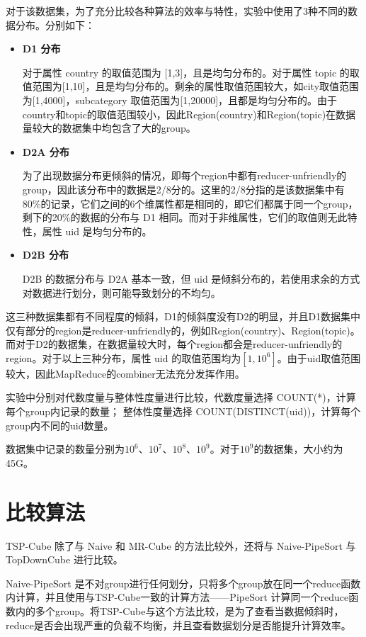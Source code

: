 对于该数据集，为了充分比较各种算法的效率与特性，实验中使用了3种不同的数据分布。分别如下：
\begin{itemize}

\item \textbf{D1 分布}

对于属性 country 的取值范围为 [1,3]，且是均匀分布的。对于属性 topic 的取值范围为[1,10]，且是均匀分布的。剩余的属性取值范围较大，如city取值范围为[1,4000]，subcategory 取值范围为[1,20000]，且都是均匀分布的。由于country和topic的取值范围较小，因此Region(country)和Region(topic)在数据量较大的数据集中均包含了大的group。

\item \textbf{D2A 分布}

为了出现数据分布更倾斜的情况，即每个region中都有reducer-unfriendly的group，因此该分布中的数据是2/8分的。这里的2/8分指的是该数据集中有80\%的记录，它们之间的6个维属性都是相同的，即它们都属于同一个group，剩下的20\%的数据的分布与 D1 相同。而对于非维属性，它们的取值则无此特性，属性 uid 是均匀分布的。

\item \textbf{D2B 分布}

D2B 的数据分布与 D2A 基本一致，但 uid 是倾斜分布的，若使用求余的方式对数据进行划分，则可能导致划分的不均匀。

\end{itemize}

这三种数据集都有不同程度的倾斜，D1的倾斜度没有D2的明显，并且D1数据集中仅有部分的region是reducer-unfriendly的，例如Region(country)、Region(topic)。而对于D2的数据集，在数据量较大时，每个region都会是reducer-unfriendly的region。对于以上三种分布，属性 uid 的取值范围均为$[1,{10}^{6}]$。由于uid取值范围较大，因此MapReduce的combiner无法充分发挥作用。

实验中分别对代数度量与整体性度量进行比较，代数度量选择 COUNT(*)，计算每个group内记录的数量； 整体性度量选择 COUNT(DISTINCT(uid))，计算每个group内不同的uid数量。

数据集中记录的数量分别为${10}^{6}$、${10}^{7}$、${10}^{8}$、${10}^{9}$。对于${10}^{9}$的数据集，大小约为45G。


\section{比较算法}

TSP-Cube 除了与 Naive 和 MR-Cube 的方法比较外，还将与 Naive-PipeSort 与 TopDownCube \cite{lee2012efficient} 进行比较。

Naive-PipeSort 是不对group进行任何划分，只将多个group放在同一个reduce函数内计算，并且使用与TSP-Cube一致的计算方法——PipeSort 计算同一个reduce函数内的多个group。将TSP-Cube与这个方法比较，是为了查看当数据倾斜时，reduce是否会出现严重的负载不均衡，并且查看数据划分是否能提升计算效率。

